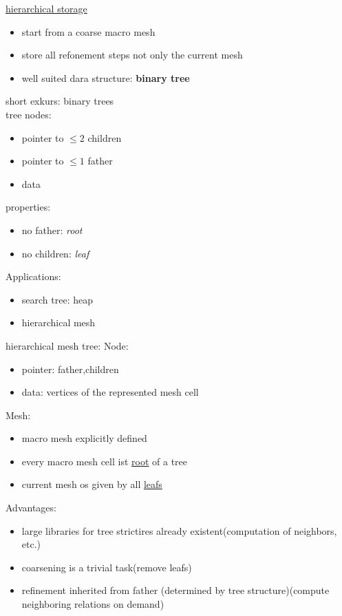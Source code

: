 \underline{hierarchical storage}
\begin{itemize}
	\item start from a coarse \glqq macro mesh \grqq
	\item store all refonement steps not only the current mesh
	\item well suited dara structure: \textbf{binary tree}
\end{itemize}

short exkurs: binary trees\\
tree nodes:
\begin{itemize}
	\item pointer to $\leq 2$ children
	\item pointer to $\leq 1$ father
	\item data
\end{itemize}
properties:
\begin{itemize}
	\item no father: \textit{root}
	\item no children: \textit{leaf}
\end{itemize}

Applications:
\begin{itemize}
	\item search tree: heap
	\item hierarchical mesh
\end{itemize}

hierarchical mesh tree:
Node:
\begin{itemize}
	\item pointer: father,children
	\item data: vertices of the represented mesh cell
\end{itemize}

Mesh:
\begin{itemize}
	\item macro mesh explicitly defined
	\item every macro mesh cell ist \underline{root} of a tree
	\item current mesh os given by all \underline{leafs}
\end{itemize}

Advantages:
\begin{itemize}
	\item large libraries for tree strictires already existent(computation of neighbors, etc.)
	\item coarsening is a trivial task(remove leafs)
	\item refinement inherited from father (determined by tree structure)(compute neighboring relations \glqq on demand\grqq)
\end{itemize}

